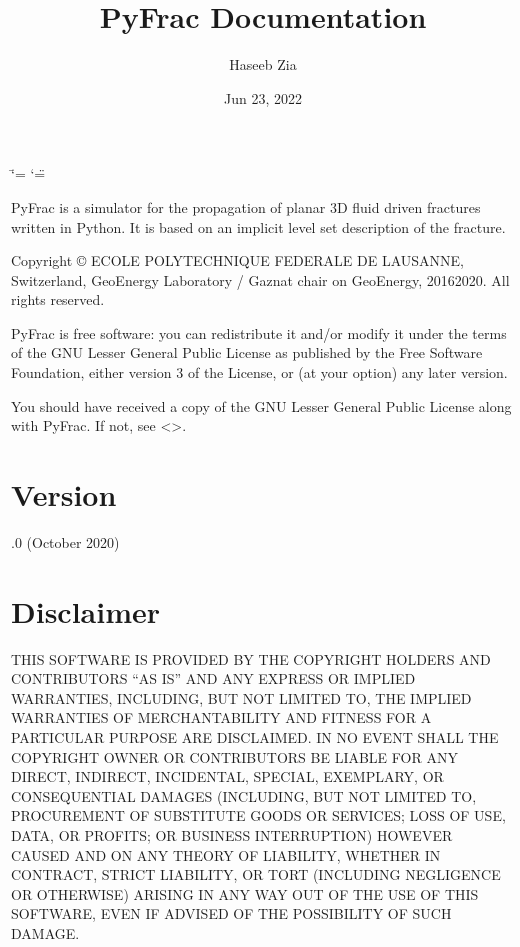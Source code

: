 \documentclass[letterpaper,10pt,english]{sphinxmanual}
\title{PyFrac Documentation}
\date{Jun 23, 2022}
\author{Haseeb Zia}
\begin{document}
\ifdefined\shorthandoff
  \ifnum\catcode`\=\string=\active\shorthandoff{=}\fi
  \ifnum\catcode`\"=\active{}\fi
\fi

\pagestyle{empty}
\sphinxmaketitle
\pagestyle{plain}
\sphinxtableofcontents
\pagestyle{normal}
\label{\detokenize{index::doc}}


\sphinxAtStartPar
PyFrac is a simulator for the propagation of planar 3D fluid driven fractures written in Python. It is based on an implicit level set description of the fracture.

\sphinxAtStartPar
Copyright © ECOLE POLYTECHNIQUE FEDERALE DE LAUSANNE, Switzerland, Geo\sphinxhyphen{}Energy Laboratory / Gaznat chair on Geo\sphinxhyphen{}Energy, 2016\sphinxhyphen{}2020.
All rights reserved.

\sphinxAtStartPar
PyFrac is free software: you can redistribute it and/or modify it under the terms of the GNU Lesser General Public License as published by the Free Software Foundation, either version 3 of the License, or (at your option) any later version.

\sphinxAtStartPar
You should have received a copy of the GNU Lesser General Public License along with PyFrac. If not, see \textless{}\textgreater{}.


\chapter{Version}
\label{\detokenize{index:version}}
.0 (October 2020)


\chapter{Disclaimer}
\label{\detokenize{index:disclaimer}}
\sphinxAtStartPar
THIS SOFTWARE IS PROVIDED BY THE COPYRIGHT HOLDERS AND CONTRIBUTORS “AS IS” AND ANY EXPRESS OR IMPLIED WARRANTIES, INCLUDING, BUT NOT LIMITED TO, THE IMPLIED WARRANTIES OF MERCHANTABILITY AND FITNESS FOR A PARTICULAR PURPOSE ARE DISCLAIMED. IN NO EVENT SHALL THE COPYRIGHT OWNER OR CONTRIBUTORS BE LIABLE FOR ANY DIRECT, INDIRECT, INCIDENTAL, SPECIAL, EXEMPLARY, OR CONSEQUENTIAL DAMAGES (INCLUDING, BUT NOT LIMITED TO, PROCUREMENT OF SUBSTITUTE GOODS OR SERVICES; LOSS OF USE, DATA, OR PROFITS; OR BUSINESS INTERRUPTION) HOWEVER CAUSED AND ON ANY THEORY OF LIABILITY, WHETHER IN CONTRACT, STRICT LIABILITY, OR TORT (INCLUDING NEGLIGENCE OR OTHERWISE) ARISING IN ANY WAY OUT OF THE USE OF THIS SOFTWARE, EVEN IF ADVISED OF THE POSSIBILITY OF SUCH DAMAGE.
\end{document}
